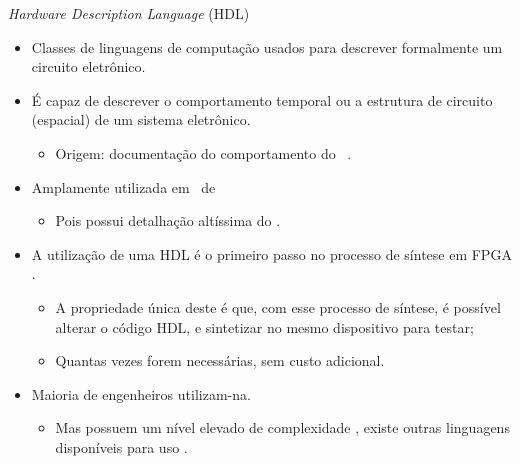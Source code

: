    \begin{frame}{\textit{Hardware Description Language} (HDL)} \vspace{-1em}
      \begin{itemize}
         \setlength{\itemsep}{0.8em}
         \item Classes de linguagens de computação usados para descrever formalmente um circuito eletrônico.
         
         \item É capaz de descrever o comportamento temporal ou a estrutura de circuito (espacial) de um sistema eletrônico. 
         \begin{itemize}
            \item Origem: documentação do comportamento do \hardware\ \cite{Sass2010}.
         \end{itemize}
         
         \item Amplamente utilizada em \design\ de \hardware
         
         \begin{itemize}
            \item Pois possui detalhação altíssima do \hardware.
         \end{itemize} 
      
         \item A utilização de uma HDL é o primeiro passo no processo de síntese em FPGA \cite{Smith1998}. 
         \begin{itemize}
            \item A propriedade única deste é que, com esse processo de síntese, é possível alterar o código HDL, e sintetizar no mesmo dispositivo para testar;
            \item Quantas vezes forem necessárias, sem custo adicional.
         \end{itemize}
         
        \item Maioria de engenheiros utilizam-na.
        \begin{itemize}
           \item Mas possuem um nível elevado de complexidade \cite{Choi2016}, existe outras linguagens disponíveis para uso \cite{Sass2010}. 
        \end{itemize}
      \end{itemize}
   \end{frame}


